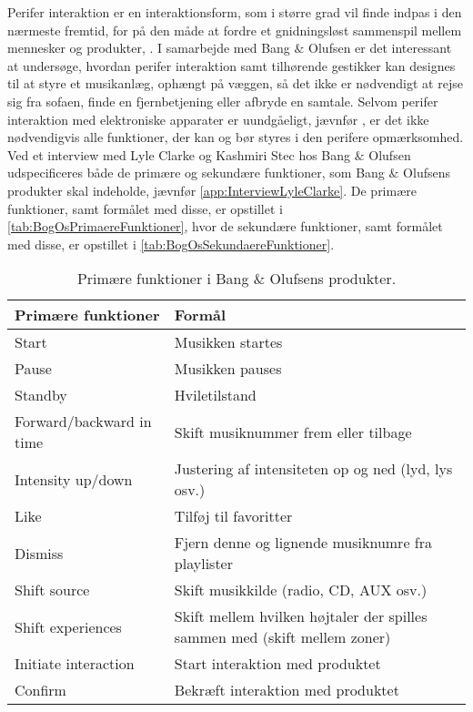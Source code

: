 Perifer interaktion er en interaktionsform, som i større grad vil finde indpas i den nærmeste fremtid, for på den måde at fordre et gnidningsløst sammenspil mellem mennesker og produkter, \parencite[s. 1]{PDF:PIIntroduction}. I samarbejde med Bang $\&$ Olufsen er det interessant at undersøge, hvordan perifer interaktion samt tilhørende gestikker kan designes til at styre et musikanlæg, ophængt på væggen, så det ikke er nødvendigt at rejse sig fra sofaen, finde en fjernbetjening eller afbryde en samtale. Selvom perifer interaktion med elektroniske apparater er uundgåeligt, jævnfør \textcite[s. 1]{PDF:PIIntroduction}, er det ikke nødvendigvis alle funktioner, der kan og bør styres i den perifere opmærksomhed. Ved et interview med Lyle Clarke og Kashmiri Stec hos Bang $\&$ Olufsen udspecificeres både de primære og sekundære funktioner, som Bang $\&$ Olufsens produkter skal indeholde, jævnfør \autoref{app:InterviewLyleClarke}. De primære funktioner, samt formålet med disse, er opstillet i \autoref{tab:BogOsPrimaereFunktioner}, hvor de sekundære funktioner, samt formålet med disse, er opstillet i \autoref{tab:BogOsSekundaereFunktioner}.
%
\begin{table}[H]
	\centering
	\begin{tabular}{ | l | p{8cm} |}
		\hline
		\multicolumn{1}{|l|}{\textbf{Primære funktioner}} & \multicolumn{1}{l|}{\textbf{Formål}} \\ \hline
		Start & Musikken startes \\ \hline
		Pause & Musikken pauses \\ \hline
		Standby & Hviletilstand \\ \hline
		Forward/backward in time & Skift musiknummer frem eller tilbage \\ \hline
		Intensity up/down & Justering af intensiteten op og ned (lyd, lys osv.) \\ \hline
		Like & Tilføj til favoritter \\ \hline
		Dismiss & Fjern denne og lignende musiknumre fra playlister \\ \hline
		Shift source & Skift musikkilde (radio, CD, AUX osv.) \\ \hline
		Shift experiences & Skift mellem hvilken højtaler der spilles sammen med (skift mellem zoner) \\ \hline
		Initiate interaction & Start interaktion med produktet \\ \hline
		Confirm & Bekræft interaktion med produktet \\ \hline
	\end{tabular}
	\caption{Primære funktioner i Bang $\&$ Olufsens produkter.}
	\label{tab:BogOsPrimaereFunktioner}
\end{table}
